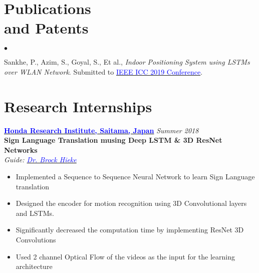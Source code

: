 \documentclass[margin,line]{res}
\newenvironment{list2}{
  \begin{list}{$\bullet$}{%
      \setlength{\itemsep}{0in}
      \setlength{\parsep}{0in} \setlength{\parskip}{0in}
      \setlength{\topsep}{0in} \setlength{\partopsep}{0in} 
      \setlength{\leftmargin}{0.2in}}}{\end{list}}
\begin{document}
\begin{resume}
\section{\sc Publications \\ and Patents}
\begin{list2}
\item  Sankhe, P., Azim, S., Goyal, S., Et al., {\em Indoor Positioning System using LSTMs over WLAN Network}. Submitted to \href{http://icc2019.ieee-icc.org}{\textcolor{blue} {IEEE ICC 2019 Conference}}.
\end{list2}

\section{\sc Research Internships}

{\bf  \href{http://www.jp.honda-ri.com/en/}{\textcolor{blue}{Honda Research Institute, Saitama, Japan}} } \hfill {\it Summer 2018} \\
\textbf{Sign Language Translation musing Deep LSTM \& 3D ResNet Networks} \\
{\em Guide: \href{https://www.researchgate.net/profile/Heike_Brock}{\textcolor{blue}{Dr. Brock Hieke}}}  \\
\vspace*{-.1in}
\begin{itemize} \itemsep=-10pt
\item Implemented a Sequence to Sequence Neural Network to learn Sign Language translation \\ 
\item Designed the encoder for motion recognition using 3D Convolutional layers and LSTMs. \\ 
\item Significantly decreased the computation time by implementing ResNet 3D Convolutions\\ 
\item Used 2 channel Optical Flow of the videos as the input for the learning architecture \\ 
\end{itemize}


\end{resume}
\end{document}
